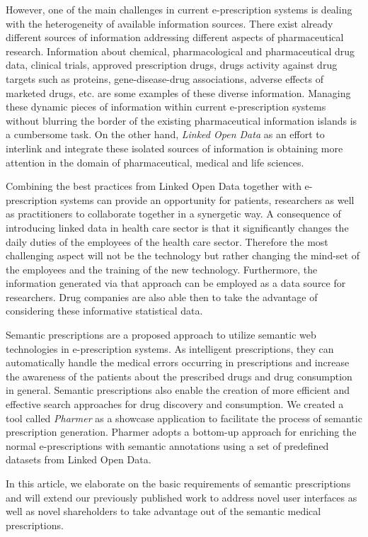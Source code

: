 \documentclass[journal]{IEEEtran}
\begin{document}
However, one of the main challenges in current e-prescription systems is dealing with the heterogeneity of available information sources.
There exist already different sources of information addressing different aspects of pharmaceutical research.
Information about chemical, pharmacological and pharmaceutical drug data, clinical trials, approved prescription drugs, drugs activity against drug targets such as proteins, gene-disease-drug associations, adverse effects of marketed drugs, etc. are some examples of these diverse information.
Managing these dynamic pieces of information within current e-prescription systems without blurring the border of the existing pharmaceutical information islands is a cumbersome task.
On the other hand, \emph{Linked Open Data} as an effort to interlink and integrate these isolated sources of information is obtaining more attention in the domain of pharmaceutical, medical and life sciences.

Combining the best practices from Linked Open Data together with e-prescription systems can provide an opportunity for patients, researchers as well as practitioners to collaborate together in a synergetic way.
A consequence of introducing linked data in health care sector is that it significantly changes the daily duties of the employees of the health care sector.
Therefore the most challenging aspect will not be the technology but rather changing the mind-set of the employees and the training of the new technology\cite{challengesEP}.
Furthermore, the information generated via that approach can be employed as a data source for researchers.
Drug companies are also able then to take the advantage of considering these informative statistical data.

Semantic prescriptions are a proposed approach to utilize semantic web technologies in e-prescription systems.
As intelligent prescriptions, they can automatically handle the medical errors occurring in prescriptions and increase the awareness of the patients about the prescribed drugs and drug consumption in general.
Semantic prescriptions also enable the creation of more efficient and effective search approaches for drug discovery and consumption.
We created a tool called \emph{Pharmer} as a showcase application to facilitate the process of semantic prescription generation.
Pharmer adopts a bottom-up approach for enriching the normal e-prescriptions with semantic annotations using a set of predefined datasets from Linked Open Data.

In this article, we elaborate on the basic requirements of semantic prescriptions and will extend our previously published work\cite{pharmerOLD} to address novel user interfaces as well as novel shareholders to take advantage out of the semantic medical prescriptions.
\end{document}
